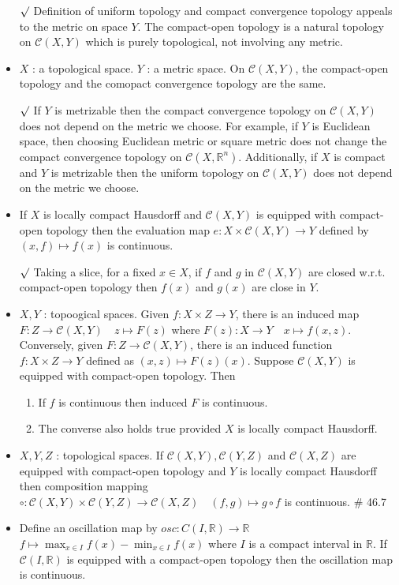 \documentclass[12pt]{article}
\newcommand{\rmk}{$\surd$}
\newcommand{\Real}{\mathbb{R}}
\newcommand{\C}{\mathcal{C}}
\begin{document}
\begin{itemize}
\begin{itemize}
	\end{itemize}
	\item[\rmk] Definition of uniform topology and compact convergence topology appeals to the metric on space $Y$. The compact-open topology is a natural topology on $\C(X,Y)$ which is purely topological, not involving any metric.
	\item $X$ : a topological space. $Y$ : a metric space. On $\C(X,Y)$, the compact-open topology and the comopact convergence topology are the same.  
	\item[\rmk] If $Y$ is metrizable then the compact convergence topology on $\C(X,Y)$ does not depend on the metric we choose. For example, if $Y$ is Euclidean space, then choosing Euclidean metric or square metric does not change the compact convergence topology on $\C(X, \Real^n)$. Additionally, if $X$ is compact and $Y$ is metrizable then the uniform topology on $\C(X,Y)$ does not depend on the metric we choose.
	\item If $X$ is locally compact Hausdorff and $\C(X,Y)$ is equipped with compact-open topology then the evaluation map $e:X\times \C(X,Y)\rightarrow Y$ defined by $(x,f)\mapsto f(x)$ is continuous.
	\item[\rmk] Taking a slice, for a fixed $x\in X$, if $f$ and $g$ in $\C(X,Y)$ are closed w.r.t. compact-open topology then $f(x)$ and $g(x)$ are close in $Y$.
	\item $X, Y$ : topoogical spaces. Given $f:X\times Z\rightarrow Y$, there is an induced map\\ $F: Z\rightarrow \C(X,Y) \quad z\mapsto F(z)$ where $F(z):X\rightarrow Y \quad x\mapsto f(x,z) $. Conversely, given $F: Z\rightarrow \C(X,Y)$, there is an induced function $f:X\times Z\rightarrow Y$ defined as $(x,z)\mapsto F(z)(x)$. Suppose $\C(X,Y)$ is equipped with compact-open topology. Then 
	\begin{enumerate}
		\item If $f$ is continuous then induced $F$ is continuous.
		\item The converse also holds true provided $X$ is locally compact Hausdorff.
	\end{enumerate}
	\item $X, Y, Z$ : topological spaces. If $\C(X,Y), \C(Y,Z)$ and $\C(X,Z)$ are equipped with compact-open topology and $Y$ is locally compact Hausdorff then composition mapping \\ $\circ : \C(X,Y)\times \C(Y,Z)\rightarrow \C(X,Z)\quad (f,g)\mapsto g\circ f$ \; is continuous. \quad  \# 46.7
	\item Define an oscillation map by $osc :C(I, \Real)\rightarrow \Real$ \quad $f\mapsto \max_{x\in I}f(x) -\min_{x\in I}f(x)$ where $I$ is a compact interval in $\Real$. If $\C(I, \Real)$ is equipped with a compact-open topology then the oscillation map is continuous.
\end{itemize}
\bigskip
\hspace{3cm}
\end{document}
